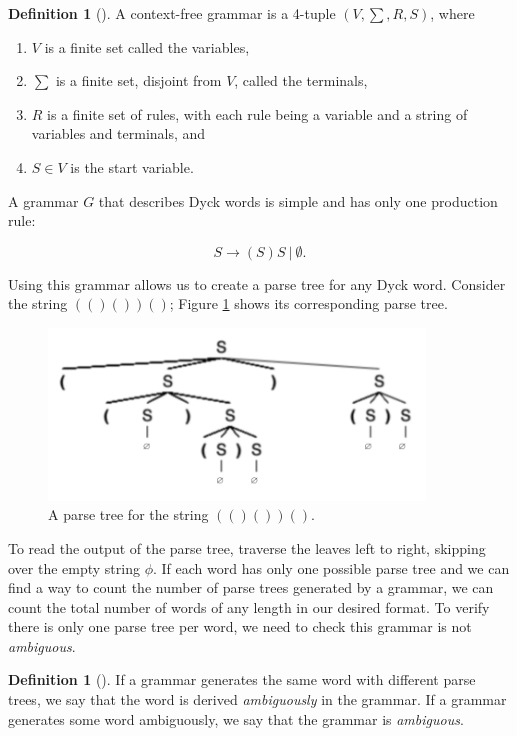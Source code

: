 \documentclass[11pt]{amsart}
\theoremstyle{plain}%
\theoremstyle{definition}
\newtheorem{defin}[thm]{{Definition}}
\theoremstyle{remark}
\numberwithin{equation}{thm}
\begin{document}
\begin{defin}[\cite{Sipser}]
A context-free grammar is a 4-tuple $(V, \sum, R, S)$, where
    \begin{enumerate}
        \item$V$ is a finite set called the variables,
        \item$\sum$ is a finite set, disjoint from $V$, called the terminals,
        \item$R$ is a finite set of rules, with each rule being a variable and a string of variables and terminals, and
        \item$S \in V$ is the start variable.
    \end{enumerate}
\end{defin}

A grammar $G$ that describes Dyck words is simple and has only one production rule: 

$$S\rightarrow (S)S\ |\ \emptyset.$$

Using this grammar allows us to create a parse tree for any Dyck word. Consider the string $(()())()$; Figure \ref{fig:parsetree} shows its corresponding parse tree.

\begin{figure}[htp]
    \centering
    \includegraphics[width=10cm]{ParseTree.png}
    \caption{A parse tree for the string $(()())()$.}
    \label{fig:parsetree}
\end{figure}

To read the output of the parse tree, traverse the leaves left to right, skipping over the empty string $\phi$. If each word has only one possible parse tree and we can find a way to count the number of parse trees generated by a grammar, we can count the total number of words of any length in our desired format. To verify there is only one parse tree per word, we need to check this grammar is not \textit{ambiguous}.

\begin{defin}[\cite{Sipser}]
If a grammar generates the same word with different parse trees, we say that the word is derived \textit{ambiguously} in the grammar. If a grammar generates some word ambiguously, we say that the grammar is \textit{ambiguous}.
\end{defin}
\end{document}
